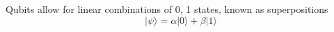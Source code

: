 \documentclass[preview]{standalone}
\begin{document}
\begin{center}
Qubits allow for linear combinations of 0, 1 states, known as superpositions $$ | \psi \rangle = \alpha | 0 \rangle + \beta | 1 \rangle$$
\end{center}
\end{document}
